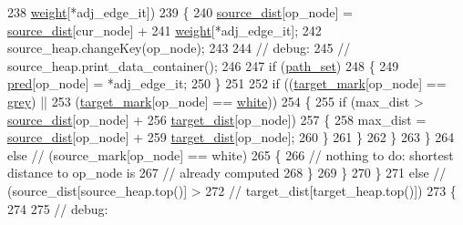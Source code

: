 \begin{DoxyCode}
238             \mbox{\hyperlink{classbid__dijkstra_a477c4f7ce631df84c832cb7d517cd243}{weight}}[*adj\_edge\_it])
239             \{
240             \mbox{\hyperlink{classbid__dijkstra_a19dc6c350617f0fa5769e5c70781d658}{source\_dist}}[op\_node] = \mbox{\hyperlink{classbid__dijkstra_a19dc6c350617f0fa5769e5c70781d658}{source\_dist}}[cur\_node] +
241                 \mbox{\hyperlink{classbid__dijkstra_a477c4f7ce631df84c832cb7d517cd243}{weight}}[*adj\_edge\_it];
242             source\_heap.changeKey(op\_node);
243 
244             \textcolor{comment}{// debug:}
245             \textcolor{comment}{// source\_heap.print\_data\_container();}
246 
247             \textcolor{keywordflow}{if} (\mbox{\hyperlink{classbid__dijkstra_aa7b329f69600fffae2753f87501dab9d}{path\_set}})
248             \{
249                 \mbox{\hyperlink{classbid__dijkstra_a930f24f8d17953eccfa0e8765587b0ea}{pred}}[op\_node] = *adj\_edge\_it;
250             \}
251 
252             \textcolor{keywordflow}{if} ((\mbox{\hyperlink{classbid__dijkstra_a72bc13758ebe2f752cd15f018c5ba64e}{target\_mark}}[op\_node] == \mbox{\hyperlink{classbid__dijkstra_a8b7dcccc9fab2ec5edc8da01029c09d5a5e3971e0090719b93ed71811edcd7360}{grey}}) ||
253                 (\mbox{\hyperlink{classbid__dijkstra_a72bc13758ebe2f752cd15f018c5ba64e}{target\_mark}}[op\_node] == \mbox{\hyperlink{classbid__dijkstra_a8b7dcccc9fab2ec5edc8da01029c09d5abbd36b03487d4100360b3d6e94309b7b}{white}}))
254             \{
255                 \textcolor{keywordflow}{if} (max\_dist > \mbox{\hyperlink{classbid__dijkstra_a19dc6c350617f0fa5769e5c70781d658}{source\_dist}}[op\_node] +
256                 \mbox{\hyperlink{classbid__dijkstra_a7a46fe8fe075d798eaca14b37aa15c0d}{target\_dist}}[op\_node])
257                 \{
258                 max\_dist = \mbox{\hyperlink{classbid__dijkstra_a19dc6c350617f0fa5769e5c70781d658}{source\_dist}}[op\_node] +
259                     \mbox{\hyperlink{classbid__dijkstra_a7a46fe8fe075d798eaca14b37aa15c0d}{target\_dist}}[op\_node];
260                 \}
261             \}
262             \}
263         \}
264         \textcolor{keywordflow}{else}    \textcolor{comment}{// (source\_mark[op\_node] == white)}
265         \{
266             \textcolor{comment}{// nothing to do: shortest distance to op\_node is}
267             \textcolor{comment}{//            already computed}
268         \}
269         \}
270     \}
271     \textcolor{keywordflow}{else}    \textcolor{comment}{// (source\_dist[source\_heap.top()] >}
272         \textcolor{comment}{//  target\_dist[target\_heap.top()])}
273     \{
274 
275         \textcolor{comment}{// debug:}

\end{DoxyCode}
